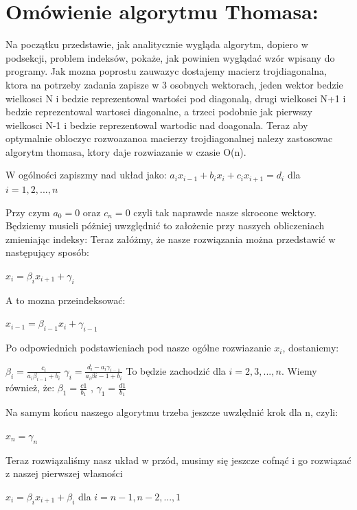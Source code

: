 \documentclass[12pt]{article}
\begin{document}
\section{Omówienie algorytmu Thomasa:}
Na początku przedstawie, jak analitycznie wygląda algorytm, dopiero w podsekcji, problem indeksów, pokaże, jak powinien wyglądać wzór wpisany do programy.\newline
Jak mozna poprostu zauwazyc dostajemy macierz trojdiagonalna, ktora na potrzeby zadania zapisze w 3 osobnych wektorach, jeden wektor bedzie wielkosci N i bedzie reprezentowal wartości pod diagonalą, drugi wielkosci N+1 i bedzie reprezentowal wartosci diagonalne, a trzeci podobnie jak pierwszy wielkosci N-1 i bedzie reprezentowal wartodic nad doagonala. Teraz aby optymalnie obloczyc rozwoazanoa macierzy trojdiagonalnej nalezy zastosowac algorytm thomasa, ktory daje rozwiazanie w czasie O(n).
\begin{center}
W ogólności zapiszmy nad układ jako:
$a_{i}x_{i-1} + b_{i}x_{i} + c_{i}x_{i+1} = d_{i}$ dla $i = 1,2,...,n$
\end{center}
Przy czym $a_{0} = 0$ oraz $c_{n} = 0$ czyli tak naprawde nasze skrocone wektory. Będziemy musieli póżniej uwzględnić to założenie przy naszych obliczeniach zmieniając indeksy:
Teraz załóżmy, że nasze rozwiązania można przedstawić w następujący sposób:
\begin{center}
$x_{i} = \beta_{i}x_{i+1} + \gamma_{i}$
\end{center}
A to mozna przeindeksować:
\begin{center}
$x_{i-1} = \beta_{i-1}x_{i} + \gamma_{i-1}$
\end{center}
Po odpowiednich podstawieniach pod nasze ogólne rozwiazanie $x_{i}$, dostaniemy:
\begin{center}
$\beta_{i} = \frac{c_{i}}{a_{i}\beta_{i-1}+b_{i}}$\newline\newline
$\gamma_{i} = \frac{d_{i}-a_{i}\gamma_{i-1}}{a_{i}\beta{i-1}+b_{i}}$\newline\newline
To będzie zachodzić dla $i=2,3,...,n$.
Wiemy również, że:\newline\newline
$\beta_{1} = \frac{c{1}}{b_{1}}$ ,
$\gamma_{1} = \frac{d{1}}{b_{1}}$
\end{center}
Na samym końcu naszego algorytmu trzeba jeszcze uwzlędnić krok dla n, czyli:
\begin{center}
$x_{n} = \gamma_{n}$
\end{center}
Teraz rozwiązaliśmy nasz układ w przód, musimy się jeszcze cofnąć i go rozwiązać z naszej pierwszej własności 
\begin{center}
$x_{i} = \beta_{i}x_{i+1}+\beta_{i}$ dla $i = n-1, n-2,...,1$
\end{center}
\end{document}
